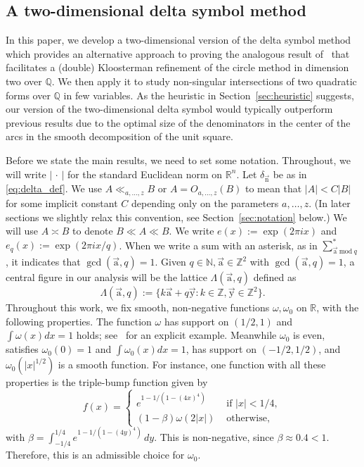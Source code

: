 \documentclass[letterpaper,11pt]{amsart}
\numberwithin{equation}{section}
\theoremstyle{definition}
\numberwithin{equation}{section}
\newcommand{\Z}{\mathbb{Z}}
\newcommand{\QQ}{\mathbb{Q}}
\newcommand{\RR}{\mathbb{R}}
\newcommand{\ua}{\vec{\mathrm{a}}}
\newcommand{\uy}{{\vec{\mathrm{y}}}}
\renewcommand{\mod}{\:\text{mod}\:}
\newcommand{\N}{\mathbb{N}}
\newcommand{\R}{\mathbb{R}}
\newcommand{\nn}{\vec{\mathrm{n}}}
\begin{document}
\subsection{A  two-dimensional delta symbol method}

In this paper, we develop a  two-dimensional version of the delta symbol method which provides an alternative approach to proving the analogous result of~\cite[Theorem 1.1]{V19} that facilitates a (double) Kloosterman refinement of the circle method in dimension two over $\mathbb Q$. We then apply it to study non-singular intersections of two quadratic forms over $\QQ$ in few variables. As the heuristic in Section~\ref{sec:heuristic} suggests, our version of the  two-dimensional delta symbol would typically outperform previous results due to the optimal size of the denominators in the center of the arcs in the smooth decomposition of the unit square. 

Before we state the main results, we need to set some notation. Throughout, we will write \(|\,\cdot\,|\) for the standard Euclidean norm on $\RR^n$. Let \(\delta_{\nn}\) be as in \eqref{eq:delta_def}.
  We use \(A \ll_{a,\dotsc,z} B\) or \(A = O_{a,\dotsc,z}(B)\) to mean that \(|A|<C|B|\) for some implicit constant \(C\) depending only on the parameters \(a,\dotsc,z\). (In later sections we slightly relax this convention, see  Section~\ref{sec:notation} below.)  We will use $A\asymp B $ to denote $B\ll A \ll B$. 
We write $e(x):=\exp(2\pi i x)$ and $e_q(x):=\exp(2\pi i x/q)$. 
When we write a sum with an asterisk, as in \(\sum_{\ua\mod q}^\ast\), it indicates that \(\gcd(\ua,q)=1\). Given \(q\in \N,\ua\in \Z^2\) with \(\gcd(\ua,q)=1\), a central figure in our analysis will be the lattice  \(\Lambda(\ua,q)\) defined as 
\begin{equation}\label{eq:Lambdadef}
\Lambda(\ua,q):=\{k\ua+q\uy: k\in\Z,\uy\in\Z^2\}.
\end{equation}
Throughout this work, we fix smooth, non-negative functions $\omega, \omega_0$ on $\R$, with the following properties. The function $\omega$ has support on $(1/2, 1)$ and $\int \omega (x)dx=1$ holds;
see~\cite[section~3]{Heath-Brown96} for an explicit example.  Meanwhile $\omega_0$ is even, satisfies $\omega_0(0)=1$ and $\int \omega_0(x)dx=1$, has support on $(-1/2,1/2)$, and $\omega_0(|x|^{1/2})$ is a smooth function. For instance, one function with all these properties is the triple-bump function given by
$$ f(x)=\begin{cases}e^{1-1/(1-(4x)^4)}&\textrm{ if }|x|<1/4,\\
(1-\beta)
\omega(2|x|)&\textrm{ otherwise,}
\end{cases}$$
with $\beta =
\int_{-1/4}^{1/4} e^{1-1/(1-(4y)^4)}\,dy.$ This 
 is non-negative, since  $\beta \approx 0.4<1$. Therefore, this is an admissible choice for $\omega_0$.
\end{document}
